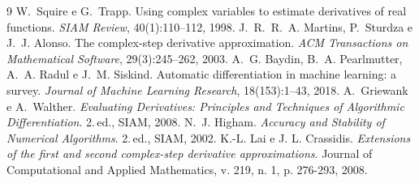 \documentclass[11pt,a4paper]{article}
\begin{document}
\begin{thebibliography}{9}
 W.~Squire e G.~Trapp. Using complex variables to estimate derivatives of real functions. \emph{SIAM Review}, 40(1):110--112, 1998.
 J.~R.~R.~A. Martins, P.~Sturdza e J.~J. Alonso. The complex-step derivative approximation. \emph{ACM Transactions on Mathematical Software}, 29(3):245--262, 2003.
 A.~G. Baydin, B.~A. Pearlmutter, A.~A. Radul e J.~M. Siskind. Automatic differentiation in machine learning: a survey. \emph{Journal of Machine Learning Research}, 18(153):1--43, 2018.
 A.~Griewank e A.~Walther. \emph{Evaluating Derivatives: Principles and Techniques of Algorithmic Differentiation}. 2.\,ed., SIAM, 2008.
 N.~J. Higham. \emph{Accuracy and Stability of Numerical Algorithms}. 2.\,ed., SIAM, 2002.
K.-L. Lai e J. L. Crassidis. 
\textit{Extensions of the first and second complex-step derivative approximations}. 
Journal of Computational and Applied Mathematics, v. 219, n. 1, p. 276-293, 2008.
\end{thebibliography}
\end{document}
